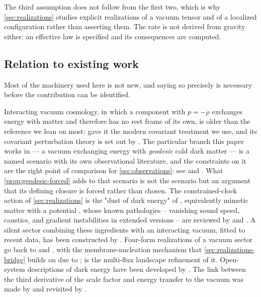 The third assumption does not follow from the first two, which is why
\cref{sec:realizations} studies explicit realizations of a vacuum tensor and of
a localized configuration rather than asserting them. The rate is not derived
from gravity either: an effective law is specified and its consequences are
computed.

\subsection{Relation to existing work}\label{sec:intro-prior}

Most of the machinery used here is not new, and saying so precisely is
necessary before the contribution can be identified.

Interacting vacuum cosmology, in which a component with $p=-\rho$ exchanges
energy with matter and therefore has no rest frame of its own, is older than
the reference we lean on most: \textcite{wands2012_12036776} gave it the
modern covariant treatment we use, and its covariant perturbation theory is
set out by \textcite{sebastianutti2023_231214123}. The particular branch this
paper works in --- a vacuum exchanging energy with \emph{geodesic} cold dark
matter --- is a named scenario with its own observational literature, and the
constraints on it are the right point of comparison for
\cref{sec:observations}: see \textcite{martinelli2019_190210694} and
\textcite{hogg2020_200210449}. What \cref{prop:geodesic-forced} adds to that
scenario is not the scenario but an argument that its defining closure is
forced rather than chosen. The constrained-clock action of
\cref{sec:realizations} is the "dust of dark energy" of
\textcite{lim2010_10035751}, equivalently mimetic matter with a potential
\parencite{chamseddine2014_14033961}, whose known pathologies -- vanishing
sound speed, caustics, and gradient instabilities in extended versions -- are
reviewed by \textcite{sebastiani2016_161208661} and
\textcite{malaeb2026_260214082}. A silent sector combining these ingredients
with an interacting vacuum, fitted to recent data, has been constructed by
\textcite{prez2026_260719494}. Four-form realizations of a vacuum sector go
back to \textcite{aurilia1980_hidden} and \textcite{hawking1984_cosmological},
with the membrane-nucleation mechanism that \cref{sec:realizations-bridge}
builds on due to \textcite{brown1987_dynamical,brown1988_neutralization};
\textcite{bousso2000_hep-th0004134} is the multi-flux landscape refinement of
it. Open-system descriptions of dark
energy have been developed by \textcite{salcedo2026_260312321}. The link
between the third derivative of the scale factor and energy transfer to the
vacuum was made by \textcite{szydlowski2005_astro-ph0502034} and revisited by
\textcite{worsley2026_260720348}.

